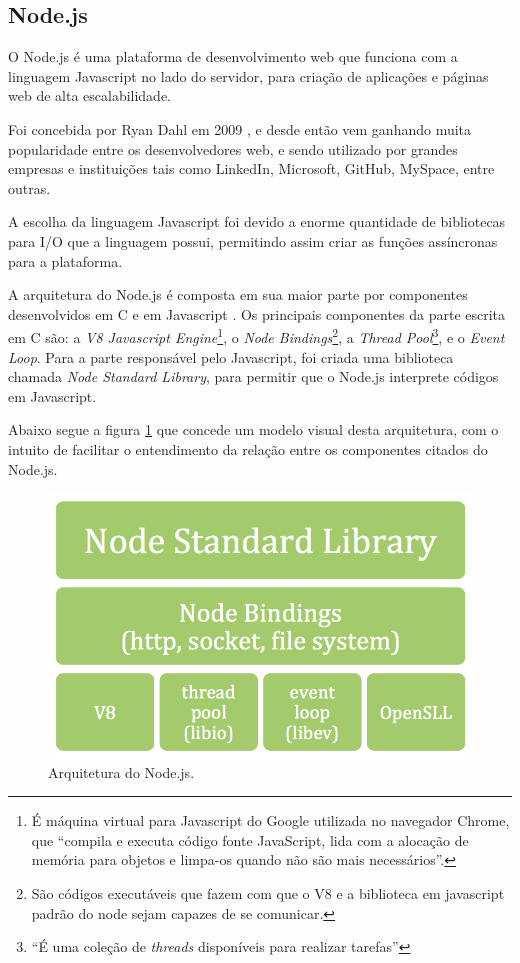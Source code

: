 \subsection{Node.js}
\label{subsec: Node.js}
\nocite{poeNode}
\nocite{MongoNode}
O Node.js é uma plataforma de desenvolvimento web que funciona com a linguagem Javascript no lado do servidor, para criação de aplicações e páginas web de alta escalabilidade. 

Foi concebida por  Ryan Dahl em 2009 \nocite{appRealTime}, e desde então vem ganhando muita popularidade entre os desenvolvedores web, e sendo utilizado por grandes empresas e instituições tais como LinkedIn, Microsoft, GitHub, MySpace, entre outras\cite{compNode}.

A escolha da linguagem Javascript foi devido a enorme quantidade de bibliotecas para I/O que a linguagem possui, permitindo assim criar as funções assíncronas para a plataforma.

A arquitetura do Node.js é composta em sua maior parte por componentes  desenvolvidos em C e em Javascript \nocite{nodeInAction}. Os principais componentes da parte escrita em C são: a \textit{V8 Javascript Engine}\footnote{É máquina virtual para Javascript do Google utilizada no navegador Chrome, que ``compila e executa código fonte JavaScript, lida com a alocação de memória para objetos e limpa-os quando não são mais necessários''\cite{v8Eng}.}, o \textit{Node Bindings}\footnote{São códigos executáveis que fazem com que o V8 e a biblioteca em javascript padrão do node sejam capazes de se comunicar.}, a  \textit{Thread Pool}\footnote{``É uma coleção de \textit{threads} disponíveis para realizar tarefas''\cite{ThreadPool}}, e o \textit{Event Loop}. Para a parte responsável pelo Javascript, foi criada uma biblioteca chamada \textit{Node Standard Library}, para permitir que o Node.js interprete códigos em Javascript.

Abaixo segue a figura \ref{fig:Arquitetura do Node.js} que concede um modelo visual desta arquitetura, com o intuito de facilitar o entendimento da relação entre os componentes citados do Node.js.

\begin{figure}[htb]
\centering
\includegraphics[scale=0.4]{images/node_platform.png}
\caption{Arquitetura do Node.js. \cite{nodeMeet}}
\label{fig:Arquitetura do Node.js}
\end{figure}
    
